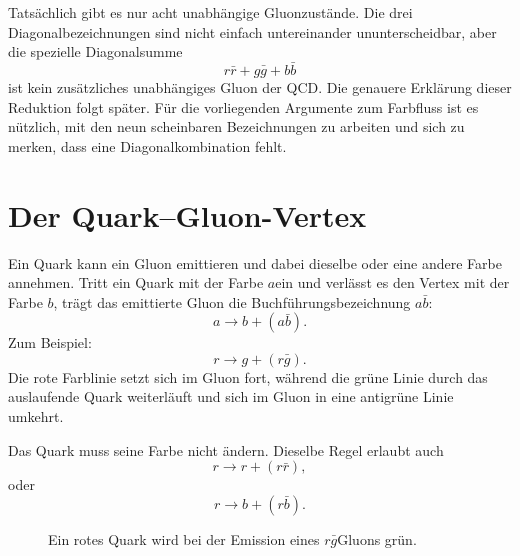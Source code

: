 \begin{classroomqa}
\end{classroomqa}

Tatsächlich gibt es nur acht unabhängige Gluonzustände. Die drei Diagonalbezeichnungen sind nicht einfach untereinander ununterscheidbar, aber die spezielle Diagonalsumme
\begin{equation}
r\bar r+g\bar g+b\bar b
\end{equation}
ist kein zusätzliches unabhängiges Gluon der QCD. Die genauere Erklärung dieser Reduktion folgt später. Für die vorliegenden Argumente zum Farbfluss ist es nützlich, mit den neun scheinbaren Bezeichnungen zu arbeiten und sich zu merken, dass eine Diagonalkombination fehlt.

\section{Der Quark--Gluon-Vertex}

Ein Quark kann ein Gluon emittieren und dabei dieselbe oder eine andere Farbe annehmen. Tritt ein Quark mit der Farbe \(a\)ein und verlässt es den Vertex mit der Farbe \(b\), trägt das emittierte Gluon die Buchführungsbezeichnung \(a\bar b\):
\begin{equation}
a\longrightarrow b+(a\bar b).
\end{equation}
Zum Beispiel:
\begin{equation}
r\longrightarrow g+(r\bar g).
\end{equation}
Die rote Farblinie setzt sich im Gluon fort, während die grüne Linie durch das auslaufende Quark weiterläuft und sich im Gluon in eine antigrüne Linie umkehrt.

Das Quark muss seine Farbe nicht ändern. Dieselbe Regel erlaubt auch
\begin{equation}
r\longrightarrow r+(r\bar r),
\end{equation}
oder
\begin{equation}
r\longrightarrow b+(r\bar b).
\end{equation}

\begin{figure}[h]
\centering
{}
\caption{Ein rotes Quark wird bei der Emission eines \(r\bar g\)Gluons grün.}
\end{figure}

